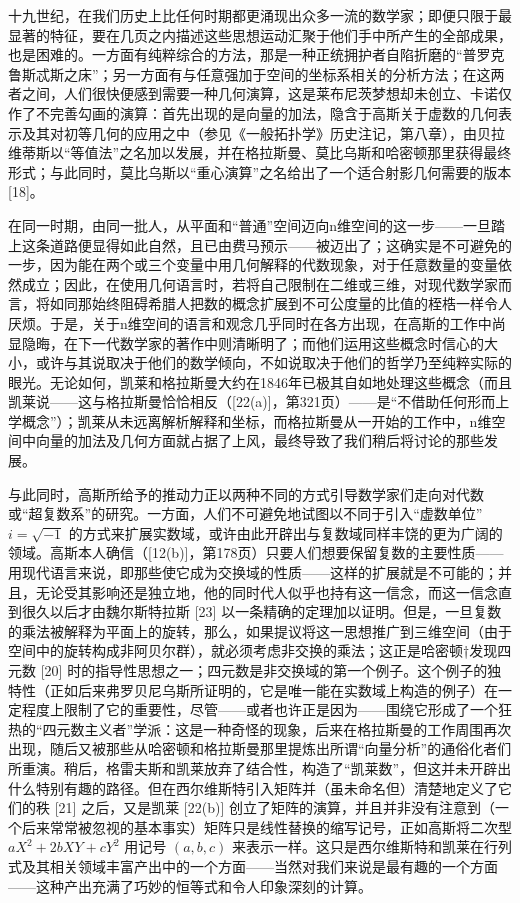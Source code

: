 十九世纪，在我们历史上比任何时期都更涌现出众多一流的数学家；即便只限于最显著的特征，要在几页之内描述这些思想运动汇聚于他们手中所产生的全部成果，也是困难的。一方面有纯粹综合的方法，那是一种正统拥护者自陷折磨的“普罗克鲁斯忒斯之床”；另一方面有与任意强加于空间的坐标系相关的分析方法；在这两者之间，人们很快便感到需要一种几何演算，这是莱布尼茨梦想却未创立、卡诺仅作了不完善勾画的演算：首先出现的是向量的加法，隐含于高斯关于虚数的几何表示及其对初等几何的应用之中（参见《一般拓扑学》历史注记，第八章），由贝拉维蒂斯以“等值法”之名加以发展，并在格拉斯曼、莫比乌斯和哈密顿那里获得最终形式；与此同时，莫比乌斯以“重心演算”之名给出了一个适合射影几何需要的版本 {[}18{]}。

在同一时期，由同一批人，从平面和“普通”空间迈向n维空间的这一步——一旦踏上这条道路便显得如此自然，且已由费马预示——被迈出了；这确实是不可避免的一步，因为能在两个或三个变量中用几何解释的代数现象，对于任意数量的变量依然成立；因此，在使用几何语言时，若将自己限制在二维或三维，对现代数学家而言，将如同那始终阻碍希腊人把数的概念扩展到不可公度量的比值的桎梏一样令人厌烦。于是，关于n维空间的语言和观念几乎同时在各方出现，在高斯的工作中尚显隐晦，在下一代数学家的著作中则清晰明了；而他们运用这些概念时信心的大小，或许与其说取决于他们的数学倾向，不如说取决于他们的哲学乃至纯粹实际的眼光。无论如何，凯莱和格拉斯曼大约在1846年已极其自如地处理这些概念（而且凯莱说——这与格拉斯曼恰恰相反（{[}22(a){]}，第321页）——是“不借助任何形而上学概念”）；凯莱从未远离解析解释和坐标，而格拉斯曼从一开始的工作中，n维空间中向量的加法及几何方面就占据了上风，最终导致了我们稍后将讨论的那些发展。

与此同时，高斯所给予的推动力正以两种不同的方式引导数学家们走向对代数或“超复数系”的研究。一方面，人们不可避免地试图以不同于引入“虚数单位” \(i = \sqrt{-1}\) 的方式来扩展实数域，或许由此开辟出与复数域同样丰饶的更为广阔的领域。高斯本人确信（{[}12(b){]}，第178页）只要人们想要保留复数的主要性质——用现代语言来说，即那些使它成为交换域的性质——这样的扩展就是不可能的；并且，无论受其影响还是独立地，他的同时代人似乎也持有这一信念，而这一信念直到很久以后才由魏尔斯特拉斯 {[}23{]} 以一条精确的定理加以证明。但是，一旦复数的乘法被解释为平面上的旋转，那么，如果提议将这一思想推广到三维空间（由于空间中的旋转构成非阿贝尔群），就必须考虑非交换的乘法；这正是哈密顿†发现四元数 {[}20{]} 时的指导性思想之一；四元数是非交换域的第一个例子。这个例子的独特性（正如后来弗罗贝尼乌斯所证明的，它是唯一能在实数域上构造的例子）在一定程度上限制了它的重要性，尽管——或者也许正是因为——围绕它形成了一个狂热的“四元数主义者”学派：这是一种奇怪的现象，后来在格拉斯曼的工作周围再次出现，随后又被那些从哈密顿和格拉斯曼那里提炼出所谓“向量分析”的通俗化者们所重演。稍后，格雷夫斯和凯莱放弃了结合性，构造了“凯莱数”，但这并未开辟出什么特别有趣的路径。但在西尔维斯特引入矩阵并（虽未命名但）清楚地定义了它们的秩 {[}21{]} 之后，又是凯莱 {[}22(b){]} 创立了矩阵的演算，并且并非没有注意到（一个后来常常被忽视的基本事实）矩阵只是线性替换的缩写记号，正如高斯将二次型 \(aX^{2} + 2bXY + cY^{2}\) 用记号 \((a, b, c)\) 来表示一样。这只是西尔维斯特和凯莱在行列式及其相关领域丰富产出中的一个方面——当然对我们来说是最有趣的一个方面——这种产出充满了巧妙的恒等式和令人印象深刻的计算。

